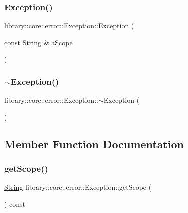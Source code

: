 \subsubsection{\texorpdfstring{Exception()}{Exception()}}
{\footnotesize\ttfamily library\+::core\+::error\+::\+Exception\+::\+Exception (\begin{DoxyParamCaption}\item[{const \hyperlink{classlibrary_1_1core_1_1types_1_1_string}{String} \&}]{a\+Scope }\end{DoxyParamCaption})}

\mbox{\label{classlibrary_1_1core_1_1error_1_1_exception_a2fc342415e921c6037465806d278d7d0}} 
\subsubsection{\texorpdfstring{$\sim$\+Exception()}{~Exception()}}
{\footnotesize\ttfamily library\+::core\+::error\+::\+Exception\+::$\sim$\+Exception (\begin{DoxyParamCaption}{ }\end{DoxyParamCaption})}



\subsection{Member Function Documentation}
\mbox{\label{classlibrary_1_1core_1_1error_1_1_exception_a9c20da352aa0785b837b43cd52d09500}} 
\subsubsection{\texorpdfstring{get\+Scope()}{getScope()}}
{\footnotesize\ttfamily \hyperlink{classlibrary_1_1core_1_1types_1_1_string}{String} library\+::core\+::error\+::\+Exception\+::get\+Scope (\begin{DoxyParamCaption}{ }\end{DoxyParamCaption}) const}


